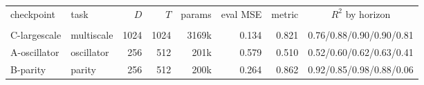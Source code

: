 \setlength{\tabcolsep}{4pt}
\begin{tabular}{llrrrrrc}
\toprule
checkpoint & task & $D$ & $T$ & params & eval MSE & metric & $R^2$ by horizon \\\\
\midrule
C-largescale & multiscale & 1024 & 1024 & 3169k & 0.134 & 0.821 & 0.76/0.88/0.90/0.90/0.81 \\
A-oscillator & oscillator & 256 & 512 & 201k & 0.579 & 0.510 & 0.52/0.60/0.62/0.63/0.41 \\
B-parity & parity & 256 & 512 & 200k & 0.264 & 0.862 & 0.92/0.85/0.98/0.88/0.06 \\
\bottomrule
\end{tabular}
